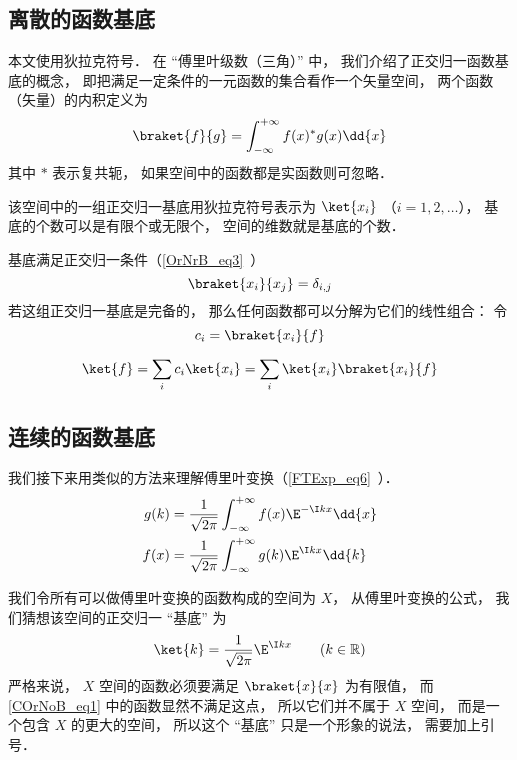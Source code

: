 

\subsection{离散的函数基底}
本文使用狄拉克符号． 在 “傅里叶级数（三角）” 中， 我们介绍了正交归一函数基底的概念， 即把满足一定条件的一元函数的集合看作一个矢量空间， 两个函数（矢量）的内积定义为
\begin{equation}
\braket{f}{g} = \int_{-\infty}^{+\infty} f(x)^* g(x) \dd{x}
\end{equation}
其中 $*$ 表示复共轭， 如果空间中的函数都是实函数则可忽略．

该空间中的一组正交归一基底用狄拉克符号表示为 $\ket{x_i}$ （$i = 1, 2,\dots$）， 基底的个数可以是有限个或无限个， 空间的维数就是基底的个数．

基底满足正交归一条件（\autoref{OrNrB_eq3}~）
\begin{equation}\label{COrNoB_eq2}
\braket{x_i}{x_j} = \delta_{i,j}
\end{equation}
若这组正交归一基底是完备的， 那么任何函数都可以分解为它们的线性组合： 令
\begin{equation}\label{COrNoB_eq5}
c_i = \braket{x_i}{f}
\end{equation}

\begin{equation}\label{COrNoB_eq6}
\ket{f} = \sum_i c_i\ket{x_i} = \sum_i \ket{x_i}\braket{x_i}{f}
\end{equation}


\subsection{连续的函数基底}
我们接下来用类似的方法来理解傅里叶变换（\autoref{FTExp_eq6}~）．
\begin{align}\label{COrNoB_eq4}
g(k) &= \frac{1}{\sqrt{2\pi }} \int_{-\infty }^{+\infty } f(x)\E^{-\I kx} \dd{x} \\
\label{COrNoB_eq3}f(x) &= \frac{1}{\sqrt{2\pi }} \int_{-\infty }^{+\infty } g(k)\E^{\I kx} \dd{k}
\end{align}

我们令所有可以做傅里叶变换的函数构成的空间为 $X$， 从傅里叶变换的公式， 我们猜想该空间的正交归一 “基底” 为
\begin{equation}\label{COrNoB_eq1}
\ket{k} = \frac{1}{\sqrt{2\pi}} \E^{\I kx} \qquad (k \in \mathbb R)
\end{equation}
严格来说， $X$ 空间的函数必须要满足 $\braket{x}{x}$ 为有限值， 而\autoref{COrNoB_eq1} 中的函数显然不满足这点， 所以它们并不属于 $X$ 空间， 而是一个包含 $X$ 的更大的空间， 所以这个 “基底” 只是一个形象的说法， 需要加上引号．

